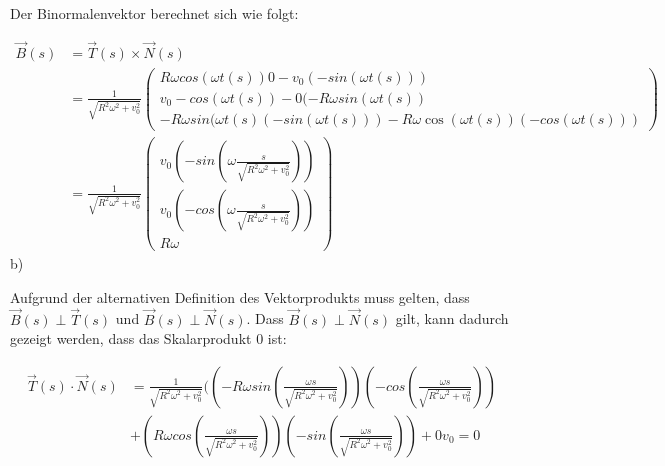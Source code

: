 \documentclass{theozettel}
\begin{document}
Der Binormalenvektor berechnet sich wie folgt:

\begin{align}
\vec{B}(s) &= \vec{T}(s) \times \vec{N}(s) \\&= \frac{1}{\sqrt{R^{2} \omega^{2} + v_0^{2}}} \begin{pmatrix}
R \omega cos(\omega t(s)) 0 - v_0 (-sin(\omega t(s))) \\
v_0 -cos(\omega t(s)) - 0 (-R \omega sin(\omega t(s)) \\
-R \omega sin(\omega t(s) (-sin(\omega t(s)))  - R \omega \cos(\omega t(s)) (-cos(\omega t(s)))
\end{pmatrix} \\ &= \frac{1}{\sqrt{R^{2} \omega^{2} + v_0^{2}}} \begin{pmatrix}
v_0 (-sin(\omega \frac{s}{\sqrt{R^{2} \omega^{2} + v_0^{2}}})) \\
v_0 (-cos(\omega \frac{s}{\sqrt{R^{2} \omega^{2} + v_0^{2}}})) \\
R \omega
\end{pmatrix}
\end{align}
b)

Aufgrund der alternativen Definition des Vektorprodukts muss gelten, dass $\vec{B}(s) \perp \vec{T}(s)$ und $\vec{B}(s) \perp \vec{N}(s)$. Dass $\vec{B}(s) \perp \vec{N}(s)$ gilt, kann dadurch gezeigt werden, dass das Skalarprodukt $0$ ist:

\begin{align}
\vec{T}(s) \cdot \vec{N}(s) &= \frac{1}{\sqrt{R^{2} \omega^{2} + v_0^{2}}}
((- R \omega sin(\frac{\omega s}{\sqrt{R^{2} \omega^{2} + v_0^{2}}})) (-cos(\frac{\omega s}{\sqrt{R^{2} \omega^{2} + v_0^{2}}})) \\&+ (R \omega cos(\frac{\omega s}{\sqrt{R^{2} \omega^{2} + v_0^2}})) (-sin(\frac{\omega s}{\sqrt{R^{2} \omega^{2}
+ v_0^{2}}})) + 0 v_0 = 0
\end{align}




\newpage
\end{document}
